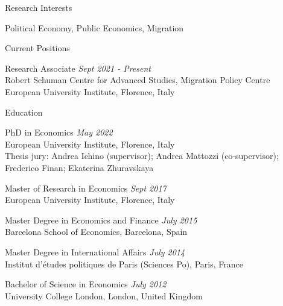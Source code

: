 \documentclass{resume} %
\begin{document}
	

\begin{rSection}{Research Interests}

Political Economy, Public Economics, Migration

	
\end{rSection}	


\begin{rSection}{Current Positions}



{Research Associate} \hfill {\em Sept 2021 - Present}
\\ Robert Schuman Centre for Advanced Studies, Migration Policy Centre
\\ European University Institute, Florence, Italy

\end{rSection}




\begin{rSection}{Education}

{PhD in Economics} \hfill {\em May 2022} 
\\ European University Institute, Florence, Italy
\\ Thesis jury: Andrea Ichino (supervisor); Andrea Mattozzi (co-supervisor); Frederico Finan; Ekaterina Zhuravskaya

{Master of Research in Economics} \hfill {\em Sept 2017}
\\ European University Institute, Florence, Italy

{Master Degree in Economics and Finance} \hfill {\em July 2015} 
\\ Barcelona School of Economics, Barcelona, Spain

{Master Degree in International Affairs } \hfill {\em July 2014} 
\\ Institut d'\'etudes politiques de Paris (Sciences Po), Paris, France

{Bachelor of Science in Economics} \hfill {\em July 2012} 
\\ University College London, London, United Kingdom



\end{rSection}
\end{document}
